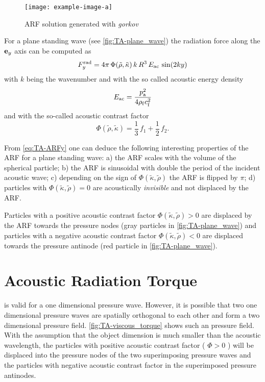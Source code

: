 \begin{figure}
    \texttt{[image: example-image-a]}
    \caption{ARF solution generated with \emph{gorkov}}
  \label{fig:TA-comparision-ARF}
\end{figure}

For a plane standing wave (see \cref{fig:TA-plane_wave}) the radiation force 
along the $\vb{e}_{y}$ axis can be computed as~\cite{Bruus2012}
\begin{equation}
  F_{y}^{\mathrm{rad}} = 
  4\pi\,\Phi(\tilde{\rho},\tilde{\kappa})\,k\,R^{3}\,E_{\mathrm{ac}}\,\sin(2ky)
  \label{eq:TA-ARFy}
\end{equation}
with $k$ being the wavenumber and with the so called acoustic energy density
\begin{equation}
  E_{\mathrm{ac}} = \frac{p_{\mathrm{a}}^{2}}{4\rho_{\mathrm{f}}c_{\mathrm{f}}^{2}}
  \label{eq:TA-Eac}
\end{equation}
and with the so-called acoustic contrast factor
\begin{equation}
  \Phi(\tilde{\rho},\tilde{\kappa}) = \frac{1}{3}\,f_{1} + \frac{1}{2}\,f_{2}.
  \label{eq:TA-Phi}
\end{equation}

From \cref{eq:TA-ARFy} one can deduce the following interesting properties of 
the ARF for a plane standing wave: a) the ARF scales with the volume of the 
spherical particle; b) the ARF is sinusoidal with double the period of the 
incident acoustic wave; c) depending on the sign of $\Phi(\tilde{\kappa}, 
\tilde{\rho})$ the ARF is flipped by $\pi$; d) particles with 
$\Phi(\tilde{\kappa}, \tilde{\rho}) = 0$ are acoustically \emph{invisible} and 
not displaced by the ARF.

Particles with a positive acoustic contrast factor $\Phi(\tilde{\kappa}, 
\tilde{\rho}) > 0$ are displaced by the ARF towards the pressure nodes (gray 
particles in \cref{fig:TA-plane_wave}) and particles with a negative acoustic 
contrast factor $\Phi(\tilde{\kappa}, \tilde{\rho}) < 0$ are displaced towards 
the pressure antinode (red particle in \cref{fig:TA-plane_wave}).




\section{Acoustic Radiation Torque\label{sec:TA-VT}}

 is valid for a one dimensional pressure wave. However, it is 
possible that two one dimensional pressure waves are spatially orthogonal to 
each other and form a two dimensional pressure field. 
\cref{fig:TA-viscous_torque} shows such an pressure field. With the assumption 
that the object dimension is much smaller than the acoustic wavelength, the 
particles with positive acoustic contrast factor ( $\Phi>0$ ) will be displaced 
into the pressure nodes of the two superimposing pressure waves and the 
particles with negative acoustic contrast factor in the superimposed pressure 
antinodes.

